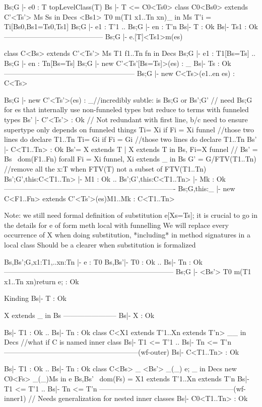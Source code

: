   Bs;G |- e0 : T
  topLevelClass(T)
  Bs |- T <= C0<Ts0>
  class C0<Bs0> extends C'<Ts'>{ Ms Ss} in Decs
  <Bs1> T0 m(T1 x1..Tn xn){_} in Ms
  T'i = Ti[Bs0,Bs1=Ts0,Ts1]
  Bs;G |- e1 : T'1 .. Bs;G |- en : T'n
  Bs|- T : Ok     Bs|- Ts1 : Ok
------------------------------------------
  Bs;G |- e.[T]<Ts1>m(es)


  class C<Bs> extends C'<Ts'>{ Ms T1 f1..Tn fn} in Decs
  Bs;G |- e1 : T1[Bs=Ts] .. Bs;G |- en : Tn[Bs=Ts]
  Bs;G |- new C'<Ts'[Bs=Ts]>(es) : _
  Bs|- Ts : Ok
--------------------------------------------------------
  Bs;G |- new C<Ts>(e1..en es) : C<Ts>


  Bs;G |- new C'<Ts'>(es) : _//incredibly subtle: is Bs;G or Bs';G' // need Bs;G for es that internally use non-funneled types but reduce to terms with funneled types
  Bs' |- C'<Ts'> : Ok // Not redundant with first line, b/c need to ensure supertype only depends on funneled things
  Ti= Xi if Fi = Xi funnel //those two lines do declare T1..Tn
  Ti= Gi if Fi = Gi        //those two lines do declare T1..Tn
  Bs' |- C<T1..Tn> : Ok
  Bs'= {X extends T | X extends T in Bs, Fi=X funnel} // Bs' = Bs \ dom(F1..Fn)
  forall Fi = Xi funnel, Xi extends _ in Bs
  G' = G/FTV(T1..Tn) //remove all the x:T when FTV(T) not a subset of FTV(T1..Tn)
  Bs';G',this:C<T1..Tn> |- M1 : Ok
  ..
  Bs';G',this:C<T1..Tn> |- Mk : Ok
-------------------------------------------------------------------------
  Bs;G,this:_ |- new C<F1..Fn> extends C'<Ts'>(es){M1..Mk} : C<T1..Tn>

Note: we still need formal definition of substitution e[Xs=Ts]; it is crucial to go in the details for e of form meth local with funnelling
We will replace every occurrence of X when doing substitution, *including* in method signatures in a local class
Should be a clearer when substitution is formalized


  Bs,Bs';G,x1:T1,..xn:Tn |- e : T0
  Bs,Bs'|- T0 : Ok .. Bs|- Tn : Ok
------------------------------------------------------------------------
  Bs;G |- <Bs'> T0 m(T1 x1..Tn xn){return e;} : Ok


  Kinding
Bs|- T : Ok

   X extends _ in Bs
-----------------------
  Bs|- X : Ok


  Bs|- T1 : Ok ..   Bs|- Tn : Ok  
  class C<X1 extends T'1..Xn extends T'n> _{_} in Decs //what if C is named inner class
  Bs|- T1 <= T'1 .. Bs|- Tn <= T'n
---------------------------------------------------------(wf-outer)
  Bs|- C<T1..Tn> : Ok

  Bs|- T1 : Ok ..   Bs|- Tn : Ok  
  class C<Bs>{ _ <Bs'> _(_) e; _} in Decs
  new C0<Fs> _(_){Ms} in e
  Bs,Bs' \ dom(Fs) = X1 extends T'1..Xn extends T'n
  Bs|- T1 <= T'1 .. Bs|- Tn <= T'n
---------------------------------------------------------(wf-inner1) // Needs generalization for nested inner classes
  Bs|- C0<T1..Tn> : Ok



